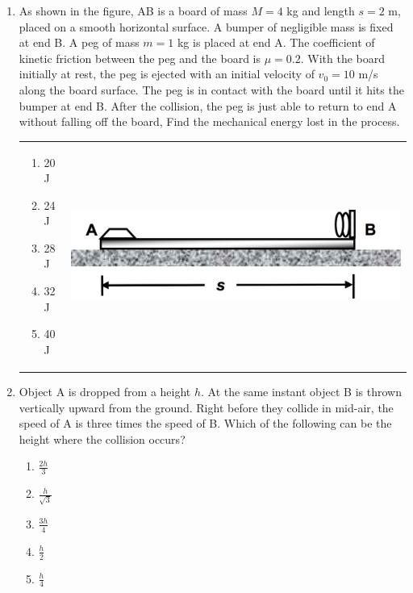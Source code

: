 \documentclass[12pt,letterpaper]{article}
\begin{document}
\begin{enumerate}
\item
As shown in the figure, AB is a board of mass $M = 4$ kg and length $s = 2$ m, placed on a smooth horizontal surface. A bumper of negligible mass is fixed at end B. A peg of mass $m = 1$ kg is placed at end A. The coefficient of kinetic friction between the peg and the board is $\mu = 0.2$. With the board initially at rest, the peg is ejected with an initial velocity of $v_0 = 10$ m/s along the board surface. The peg is in contact with the board until it hits the bumper at end B. After the collision, the peg is just able to return to end A without falling off the board, Find the mechanical energy lost in the process.

\begin{tabular}{l r}

\begin{minipage}{0.4\textwidth}
\begin{enumerate}
\item 20 J
\item 24 J
\item 28 J
\item 32 J
\item 40 J
\end{enumerate}
\end{minipage} &
\begin{minipage}{0.5\textwidth}
\includegraphics[width=\textwidth]{bumper.png}
\end{minipage}
\end{tabular}

\item
Object A is dropped from a height $h$. At the same instant object B is thrown vertically upward from the ground. Right before they collide in mid-air, the speed of A is three times the speed of B. Which of the following can be the height where the collision occurs?
\begin{enumerate}
\item $\displaystyle \frac{2h}{3}$
\item $\displaystyle \frac{h}{\sqrt{3}}$
\item $\displaystyle \frac{3h}{4}$
\item $\displaystyle \frac{h}{2}$
\item $\displaystyle \frac{h}{4}$
\end{enumerate}


\end{enumerate}
\end{document}
